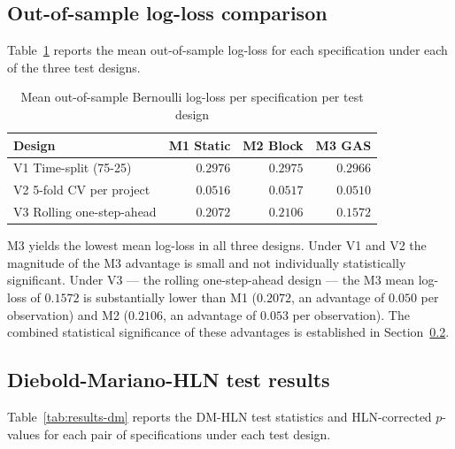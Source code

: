 \documentclass[12pt,a4paper]{article}
\theoremstyle{plain}
\theoremstyle{definition}
\begin{document}
\subsection{Out-of-sample log-loss comparison}
\label{sec:results-oos}

Table~\ref{tab:results-oos} reports the mean out-of-sample log-loss for each specification under each of the three test designs.

\begin{table}[!htbp]
\centering
\caption{Mean out-of-sample Bernoulli log-loss per specification per test design}
\label{tab:results-oos}
\begin{tabular}{lrrr}
\toprule
Design & M1 Static & M2 Block & M3 GAS \\
\midrule
V1 Time-split (75-25) & $0.2976$ & $0.2975$ & $\mathbf{0.2966}$ \\
V2 5-fold CV per project & $0.0516$ & $0.0517$ & $\mathbf{0.0510}$ \\
V3 Rolling one-step-ahead & $0.2072$ & $0.2106$ & $\mathbf{0.1572}$ \\
\bottomrule
\end{tabular}
\end{table}

M3 yields the lowest mean log-loss in all three designs. Under V1 and V2 the magnitude of the M3 advantage is small and not individually statistically significant. Under V3 --- the rolling one-step-ahead design --- the M3 mean log-loss of $0.1572$ is substantially lower than M1 ($0.2072$, an advantage of $0.050$ per observation) and M2 ($0.2106$, an advantage of $0.053$ per observation). The combined statistical significance of these advantages is established in Section~\ref{sec:results-dm}.

\subsection{Diebold-Mariano-HLN test results}
\label{sec:results-dm}

Table~\ref{tab:results-dm} reports the DM-HLN test statistics and HLN-corrected $p$-values for each pair of specifications under each test design.
\end{document}
